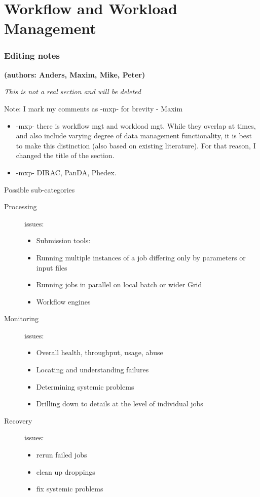 \section{Workflow and Workload Management}

\subsubsection{Editing notes}

\textbf{(authors: Anders, Maxim, Mike, Peter)}

\textit{This is not a real section and will be deleted}

Note: I mark my comments as -mxp- for brevity - Maxim

\begin{itemize}
\item -mxp- there is workflow mgt and workload mgt. While they overlap at times, and also include varying degree of data management functionality, it is best to make this distinction (also based on existing literature). For that reason, I changed the title of the section.
\item -mxp- DIRAC, PanDA, Phedex.


\end{itemize}
Possible sub-categories
\begin{description}
\item[Processing] issues:

  \begin{itemize}
  \item Submission tools:
  \item Running multiple instances of a job differing only by parameters or input files
  \item Running jobs in parallel on local batch or wider Grid
  \item Workflow engines
  \end{itemize}
\item[Monitoring] issues:
  \begin{itemize}
  \item Overall health, throughput, usage, abuse
  \item Locating and understanding failures
  \item Determining systemic problems
  \item Drilling down to details at the level of individual jobs
  \end{itemize}
\item[Recovery] issues:
  \begin{itemize}
  \item rerun failed jobs
  \item clean up droppings
  \item fix systemic problems
  \end{itemize}
\end{description}

